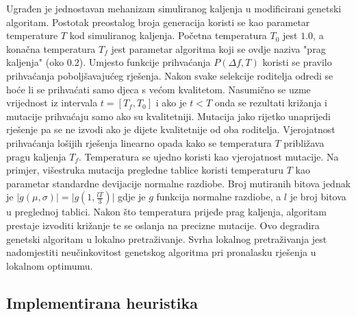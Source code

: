 \documentclass[times, utf8, diplomski]{fer}
\begin{document}
Ugrađen je jednostavan mehanizam simuliranog kaljenja u modificirani genetski algoritam. Postotak preostalog broja generacija koristi se kao parametar temperature $T$ kod simuliranog kaljenja. Početna temperatura $T_{0}$ jest $1.0$, a konačna temperatura $T_{f}$ jest parametar algoritma koji se ovdje naziva "prag kaljenja" (oko $0.2$). Umjesto funkcije prihvaćanja $P(\Delta f, T)$ koristi se pravilo prihvaćanja poboljšavajućeg rješenja. Nakon svake selekcije roditelja odredi se hoće li se prihvaćati samo djeca s većom kvalitetom. Nasumično se uzme vrijednost iz intervala $t=[T_{f}, T_{0}]$ i ako je $t<T$ onda se rezultati križanja i mutacije prihvaćaju samo ako su kvalitetniji. Mutacija jako rijetko unaprijedi rješenje pa se ne izvodi ako je dijete kvalitetnije od oba roditelja. Vjerojatnost prihvaćanja lošijih rješenja linearno opada kako se temperatura $T$ približava pragu kaljenja $T_{f}$. Temperatura se ujedno koristi kao vjerojatnost mutacije. Na primjer, višestruka mutacija pregledne tablice koristi temperaturu $T$ kao parametar standardne devijacije normalne razdiobe. Broj mutiranih bitova jednak je $\lvert g(\mu, \sigma) \rvert = \lvert g(1, \frac{lT}{3}) \rvert$ gdje je $g$ funkcija normalne razdiobe, a $l$ je broj bitova u preglednoj tablici. Nakon što temperatura prijeđe prag kaljenja, algoritam prestaje izvoditi križanje te se oslanja na precizne mutacije. Ovo degradira genetski algoritam u lokalno pretraživanje. Svrha lokalnog pretraživanja jest nadomjestiti neučinkovitost genetskog algoritma pri pronalasku rješenja u lokalnom optimumu.

\subsection{Implementirana heuristika} \label{subsec:solver}
\end{document}
